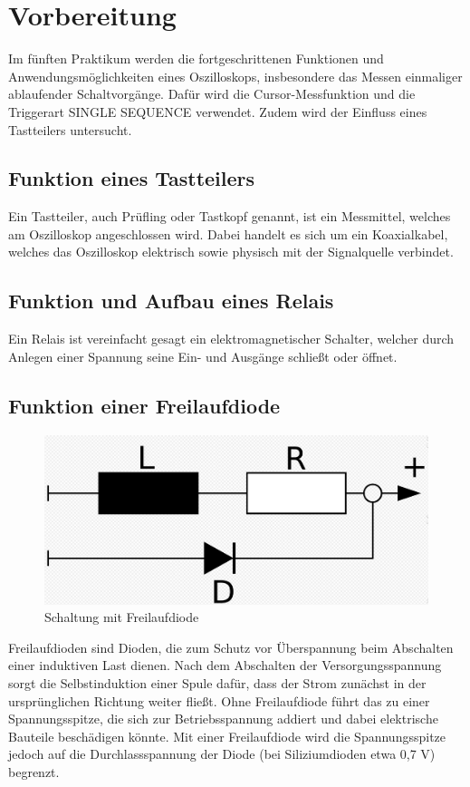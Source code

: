 \documentclass{article}
\begin{document}
\newpage
\thispagestyle{empty}

\tableofcontents


\newpage

\section{Vorbereitung}
Im fünften Praktikum werden die fortgeschrittenen Funktionen und Anwendungsmöglichkeiten eines Oszilloskops, insbesondere das Messen einmaliger ablaufender Schaltvorgänge.
Dafür wird die Cursor-Messfunktion und die Triggerart SINGLE SEQUENCE verwendet.
Zudem wird der Einfluss eines Tastteilers untersucht.
 
\subsection{Funktion eines Tastteilers}
Ein Tastteiler, auch Prüfling oder Tastkopf genannt, ist ein Messmittel, welches am Oszilloskop angeschlossen wird. Dabei handelt es sich um ein Koaxialkabel, welches das Oszilloskop elektrisch sowie physisch mit der Signalquelle verbindet.
 
\subsection{Funktion und Aufbau eines Relais}
Ein Relais ist vereinfacht gesagt ein elektromagnetischer Schalter, welcher durch Anlegen einer Spannung seine Ein- und Ausgänge schließt oder öffnet.
 
\subsection{Funktion einer Freilaufdiode}
\begin{figure}[h]
  \begin{center}
    \includegraphics[scale=0.2]{../assets/images/ET2P4/freilaufdiode.JPG}
    \caption{Schaltung mit Freilaufdiode}
\end{center}
\end{figure}
Freilaufdioden sind Dioden, die zum Schutz vor Überspannung beim Abschalten einer induktiven Last dienen.
Nach dem Abschalten der Versorgungsspannung sorgt die Selbstinduktion einer Spule dafür, dass der Strom zunächst in der ursprünglichen Richtung weiter fließt. 
Ohne Freilaufdiode führt das zu einer Spannungsspitze, die sich zur Betriebsspannung addiert und dabei elektrische Bauteile beschädigen könnte.
Mit einer Freilaufdiode wird die Spannungsspitze jedoch auf die Durchlassspannung der Diode (bei Siliziumdioden etwa 0,7 V) begrenzt. 
\newpage
\end{document}
